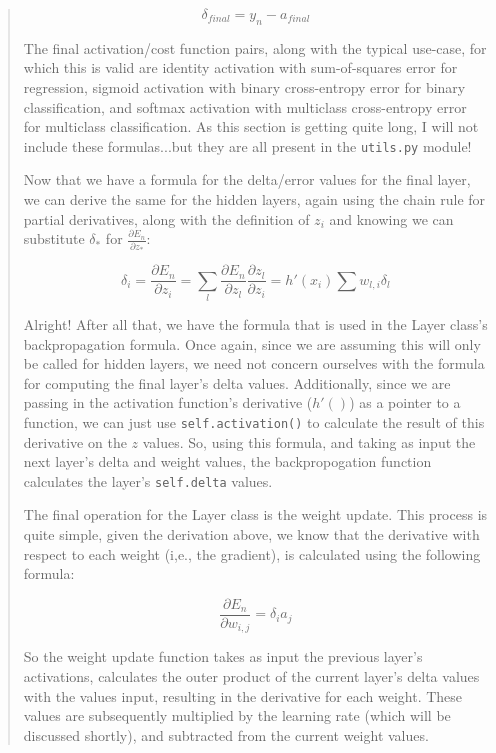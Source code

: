 \documentclass{article}
\begin{document}
\begin{quote}
  $$\delta_{final} = y_n - a_{final} $$
 
 The final activation/cost function pairs, along with the typical use-case, for which this is valid are identity activation with sum-of-squares error for regression, sigmoid activation with binary cross-entropy error for binary classification, and softmax activation with multiclass cross-entropy error for multiclass classification. As this section is getting quite long, I will not include these formulas...but they are all present in the \texttt{utils.py} module!
 
 Now that we have a formula for the delta/error values for the final layer, we can derive the same for the hidden layers, again using the chain rule for partial derivatives, along with the definition of $z_i$ and knowing we can substitute $\delta_*$ for $\frac{\partial E_n}{\partial z_{*}}$:
 
 $$\delta_i = \frac{\partial E_n}{\partial z_{i}} = \sum_{l} \frac{\partial E_n}{\partial z_{l}} \frac{\partial z_l}{\partial z_{i}} = h'(x_i)\sum w_{l,i} \delta_l$$
 
 Alright! After all that, we have the formula that is used in the Layer class's backpropagation formula. Once again, since we are assuming this will only be called for hidden layers, we need not concern ourselves with the formula for computing the final layer's delta values. Additionally, since we are passing in the activation function's derivative ($h'()$) as a pointer to a function, we can just use \texttt{self.activation()} to calculate the result of this derivative on the $z$ values. So, using this formula, and taking as input the next layer's delta and weight values, the backpropogation function calculates the layer's \texttt{self.delta} values.
 
The final operation for the Layer class is the weight update. This process is quite simple, given the derivation above, we know that the derivative with respect to each weight (i,e., the gradient), is calculated using the following formula:

$$\frac{\partial E_n}{\partial w_{i,j}} = \delta_i a_j $$

So the weight update function takes as input the previous layer's activations, calculates the outer product of the current layer's delta values with the values input, resulting in the derivative for each weight. These values are subsequently multiplied by the learning rate (which will be discussed shortly), and subtracted from the current weight values.


\end{quote}
\end{document}

